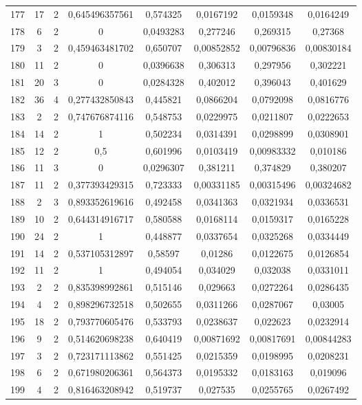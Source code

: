 \begin{longtable}{|c|c|c|c|c|c|c|c|}
177 & 17 & 2 & 0,645496357561 & 0,574325 & 0,0167192 & 0,0159348 & 0,0164249  \\
178 & 6 & 2 & 0 & 0,0493283 & 0,277246 & 0,269315 & 0,27368  \\
179 & 3 & 2 & 0,459463481702 & 0,650707 & 0,00852852 & 0,00796836 & 0,00830184  \\
180 & 11 & 2 & 0 & 0,0396638 & 0,306313 & 0,297956 & 0,302221  \\
181 & 20 & 3 & 0 & 0,0284328 & 0,402012 & 0,396043 & 0,401629  \\
182 & 36 & 4 & 0,277432850843 & 0,445821 & 0,0866204 & 0,0792098 & 0,0816776  \\
183 & 2 & 2 & 0,747676874116 & 0,548753 & 0,0229975 & 0,0211807 & 0,0222653  \\
184 & 14 & 2 & 1 & 0,502234 & 0,0314391 & 0,0298899 & 0,0308901  \\
185 & 12 & 2 & 0,5 & 0,601996 & 0,0103419 & 0,00983332 & 0,010186  \\
186 & 11 & 3 & 0 & 0,0296307 & 0,381211 & 0,374829 & 0,380207  \\
187 & 11 & 2 & 0,377393429315 & 0,723333 & 0,00331185 & 0,00315496 & 0,00324682  \\
188 & 2 & 3 & 0,893352619616 & 0,492458 & 0,0341363 & 0,0321934 & 0,0336531  \\
189 & 10 & 2 & 0,644314916717 & 0,580588 & 0,0168114 & 0,0159317 & 0,0165228  \\
190 & 24 & 2 & 1 & 0,448877 & 0,0337654 & 0,0325268 & 0,0334449  \\
191 & 14 & 2 & 0,537105312897 & 0,58597 & 0,01286 & 0,0122675 & 0,0126854  \\
192 & 11 & 2 & 1 & 0,494054 & 0,034029 & 0,032038 & 0,0331011  \\
193 & 2 & 2 & 0,835398992861 & 0,515146 & 0,029663 & 0,0272264 & 0,0286435  \\
194 & 4 & 2 & 0,898296732518 & 0,502655 & 0,0311266 & 0,0287067 & 0,03005  \\
195 & 18 & 2 & 0,793770605476 & 0,533793 & 0,0238637 & 0,022623 & 0,0232914  \\
196 & 9 & 2 & 0,514620698238 & 0,640419 & 0,00871692 & 0,00817691 & 0,00844283  \\
197 & 3 & 2 & 0,723171113862 & 0,551425 & 0,0215359 & 0,0198995 & 0,0208231  \\
198 & 6 & 2 & 0,671980206361 & 0,564373 & 0,0195332 & 0,0183163 & 0,019096  \\
199 & 4 & 2 & 0,816463208942 & 0,519737 & 0,027535 & 0,0255765 & 0,0267492  \\

\end{longtable}
